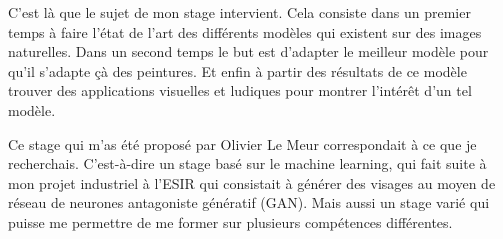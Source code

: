 \par
C'est là que le sujet de mon stage intervient. Cela consiste dans un premier temps à faire l'état de l'art des différents modèles qui existent sur des images naturelles. Dans un second temps le but est d'adapter le meilleur modèle pour qu'il s'adapte çà des peintures. Et enfin à partir des résultats de ce modèle trouver des applications visuelles et ludiques pour montrer l'intérêt d'un tel modèle.

\par 
Ce stage qui m'as été proposé par Olivier Le Meur correspondait à ce que je recherchais. C'est-à-dire un stage basé sur le machine learning, qui fait suite à mon projet industriel à l'ESIR qui consistait à générer des visages au moyen de réseau de neurones antagoniste génératif (GAN). Mais aussi un stage varié qui puisse me permettre de me former sur plusieurs compétences différentes.




